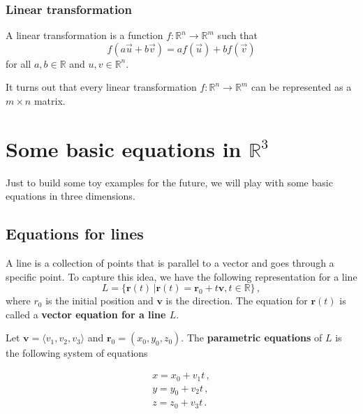 \documentclass[
]{book}
\theoremstyle{definition}
\theoremstyle{definition}
\theoremstyle{definition}
\theoremstyle{definition}
\theoremstyle{remark}
\begin{document}
\subsection{Linear transformation}\label{linear-transformation}

A linear transformation is a function \(f: \mathbb{R}^n \to \mathbb{R}^m\) such that
\[ f(a \vec{u} + b \vec{v} ) = a f(\vec{u}) + b f(\vec{v}) \]
for all \(a,b \in \mathbb{R}\) and \(u,v \in \mathbb{R}^n\).

It turns out that every linear transformation \(f: \mathbb{R}^n \to \mathbb{R}^m\)
can be represented as a \(m\times n\) matrix.

\newpage

\chapter{\texorpdfstring{Some basic equations in \(\mathbb{R}^3\)}{Some basic equations in \textbackslash mathbb\{R\}\^{}3}}\label{some-basic-equations-in-mathbbr3}

Just to build some toy examples for the future, we will play with some basic
equations in three dimensions.

\section{Equations for lines}\label{equations-for-lines}

A line is a collection of points that is parallel to a vector and goes through a
specific point.
To capture this idea, we have the following representation for a line
\begin{equation*}
    L = \{\mathbf{r}(t) \,|  \mathbf{r}(t) = \mathbf{r}_0 + t \mathbf{v}, t\in \mathbb{R}\}  \,,
\end{equation*}
where \({r}_0\) is the initial position and \(\mathbf{v}\) is the direction.
The equation for \(\mathbf{r}(t)\) is called a \textbf{vector equation for a line \(L\)}.

Let \(\mathbf{v} = \langle v_1, v_2, v_3 \rangle\) and \(\mathbf{r}_0 = ( x_0, y_0, z_0 )\).
The \textbf{parametric equations} of \(L\) is the following system of equations

\begin{gather*}
    x = x_0 + v_1 t\,, \\
    y = y_0 + v_2 t\,, \\
    z = z_0 + v_3 t \,. 
\end{gather*}
\end{document}
